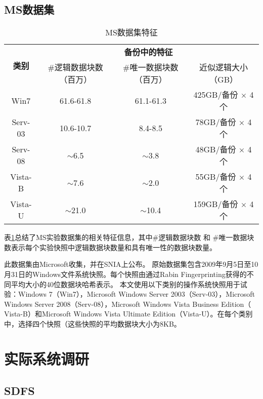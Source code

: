 \subsection{MS数据集}
\label{sec:ubc-ms}
\begin{table}[!hbt]
    \caption{MS数据集特征}
\small
\label{tab:MS-dataset}
\renewcommand{\arraystretch}{1.2}
\vspace{-3pt}
\centering
\begin{tabular}{|c|c|c|c|}
\hline
\multirow{2}{*}{\bf 类别} & \multicolumn{3}{c|}{\bf 备份中的特征} \\
\cline{2-4}
    & \#逻辑数据块数（百万） & \#唯一数据块数（百万） & 近似逻辑大小（GB）\\

\hline
Win7  & 61.6-61.8 & 61.1-61.3 & 425GB/备份 $\times$ 4 个\\
\cline{1-4}
Serv-03 & 10.6-10.7 & 8.4-8.5 & 78GB/备份 $\times$ 4 个\\
\cline{1-4}
Serv-08 & $\sim$6.5 & $\sim$3.8 & 48GB/备份 $\times$ 4 个\\
\cline{1-4}
Vista-B &  $\sim$7.6 & $\sim$2.0 & 55GB/备份 $\times$ 4 个\\
\cline{1-4}
Vista-U &  $\sim$21.0 & $\sim$10.4 & 159GB/备份 $\times$ 4 个\\
\hline
\end{tabular}
\end{table}

表\ref{tab:MS-dataset}总结了MS实验数据集的相关特征信息，其中\#逻辑数据块数 和 \#唯一数据块数表示每个实验快照中逻辑数据块数量和具有唯一性的数据块数量。

此数据集由Microsoft\cite{meyer2012study}收集，并在SNIA\cite{ms}上公布。 原始数据集包含2009年9月5日至10月31日的Windows文件系统快照。每个快照由通过Rabin Fingerprinting\cite{rabin1981fingerprinting}获得的不同平均大小的40位数据块哈希表示。 本文使用以下类别的操作系统快照用于试验：Windows 7（Win7），Microsoft Windows Server 2003（Serv-03），Microsoft Windows Server 2008（Serv-08），Microsoft Windows Vista Business Edition（ Vista-B）和Microsoft Windows Vista Ultimate Edition（Vista-U）。在每个类别中，选择四个快照（这些快照的平均数据块大小为8KB。 


\section{实际系统调研}
\subsection{SDFS}

